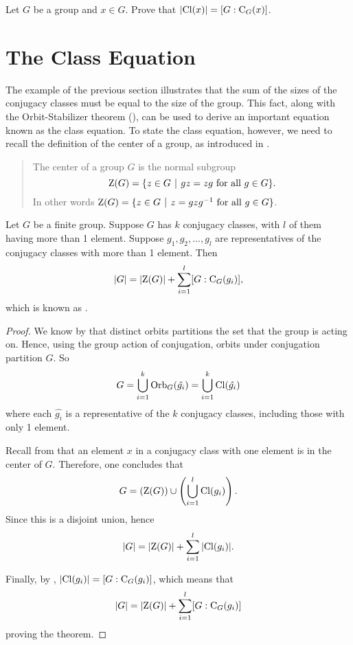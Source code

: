 \begin{exercise}\label{exercise-cardinality-of-conjugacy-class}
    Let $G$ be a group and $x \in G$. Prove that $|\mathrm{Cl}(x)| = [G : \mathrm{C}_{G}(x)]$.
\end{exercise}

\section{The Class Equation}
The example of the previous section illustrates that the sum of the sizes of the conjugacy classes must be equal to the size of the group. This fact, along with the Orbit-Stabilizer theorem (), can be used to derive an important equation known as the class equation. To state the class equation, however, we need to recall the definition of the center of a group, as introduced in .
\begin{quote}
    The center of a group $G$ is the normal subgroup
    \[
        \CenterGrp{G} = \{z \in G \vert gz = zg \text{ for all } g \in G\}.
    \]
    In other words $\CenterGrp{G} = \{z \in G \vert z = gzg^{-1} \text{ for all } g \in G\}$.
\end{quote}

\begin{theorem}\label{thrm-class-equation}
    Let $G$ be a finite group. Suppose $G$ has $k$ conjugacy classes, with $l$ of them having more than 1 element. Suppose $g_1, g_2, \dots, g_l$ are representatives of the conjugacy classes with more than 1 element. Then
    \[
        |G| = |\mathrm{Z}(G)| + \sum_{i=1}^l [G : \mathrm{C}_{G}(g_i)],
    \]
    which is known as .
\end{theorem}

\begin{proof}
    We know by  that distinct orbits partitions the set that the group is acting on. Hence, using the group action of conjugation, orbits under conjugation partition $G$. So
    \[
        G = \bigcup_{i=1}^k \mathrm{Orb}_{G}(\hat{g_i}) = \bigcup_{i=1}^k \mathrm{Cl}(\hat{g_i})
    \]
    where each $\hat{g_i}$ is a representative of the $k$ conjugacy classes, including those with only 1 element.

    Recall from  that an element $x$ in a conjugacy class with one element is in the center of $G$. Therefore, one concludes that
    \[
        G = \left(\mathrm{Z}(G)\right) \cup \left(\bigcup_{i=1}^l \mathrm{Cl}(g_i)\right).
    \]
    Since this is a disjoint union, hence
    \[
        |G| = |\mathrm{Z}(G)| + \sum_{i=1}^l |\mathrm{Cl}(g_i)|.
    \]

    Finally, by , $|\mathrm{Cl}(g_i)| = [G : \mathrm{C}_{G}(g_i)]$, which means that
    \[
        |G| = |\mathrm{Z}(G)| + \sum_{i=1}^l [G:\mathrm{C}_{G}(g_i)]
    \]
    proving the theorem.
\end{proof}

